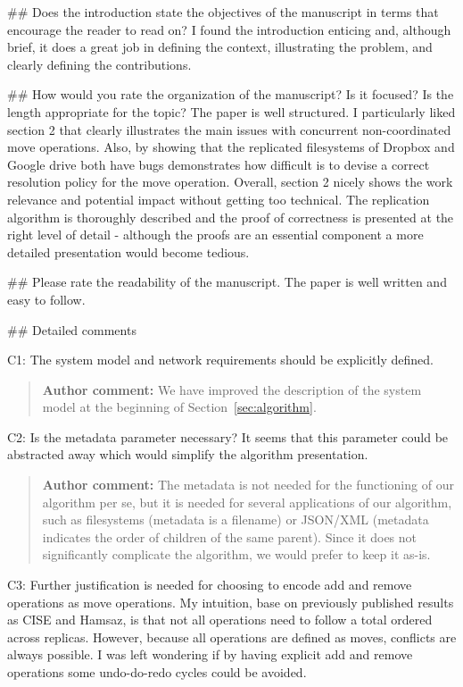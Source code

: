 \documentclass[10pt]{article}
\newcommand{\authorcomment}[1]{\begin{quote}\textbf{Author comment:} #1\end{quote}}
\begin{document}
\begin{spverbatim}
## Does the introduction state the objectives of the manuscript in terms that encourage the reader to read on?
I found the introduction enticing and, although brief, it does a great job in defining the context, illustrating the problem, and clearly defining the contributions.

## How would you rate the organization of the manuscript? Is it focused? Is the length appropriate for the topic?
The paper is well structured. I particularly liked section 2 that clearly illustrates the main issues with concurrent non-coordinated move operations. Also, by showing that the replicated filesystems of Dropbox and Google drive both have bugs demonstrates how difficult is to devise a correct resolution policy for the move operation. Overall, section 2 nicely shows the work relevance and potential impact without getting too technical.
The replication algorithm is thoroughly described and the proof of correctness is presented at the right level of detail - although the proofs are an essential component a more detailed presentation would become tedious.  

## Please rate the readability of the manuscript.
The paper is well written and easy to follow.

## Detailed comments

C1: The system model and network requirements should be explicitly defined.
\end{spverbatim}
\authorcomment{We have improved the description of the system model at the beginning of Section~\ref{sec:algorithm}.}
\begin{spverbatim}
C2: Is the metadata parameter necessary? It seems that this parameter could be abstracted away which would simplify the algorithm presentation.
\end{spverbatim}
\authorcomment{The metadata is not needed for the functioning of our algorithm per se, but it is needed for several applications of our algorithm, such as filesystems (metadata is a filename) or JSON/XML (metadata indicates the order of children of the same parent).
Since it does not significantly complicate the algorithm, we would prefer to keep it as-is.}
\begin{spverbatim}
C3: Further justification is needed for choosing to encode add and remove operations as move operations. My intuition, base on previously published results as CISE and Hamsaz, is that not all operations need to follow a total ordered across replicas. However, because all operations are defined as moves, conflicts are always possible. I was left wondering if by having explicit add and remove operations some undo-do-redo cycles could be avoided.
\end{spverbatim}
\end{document}
